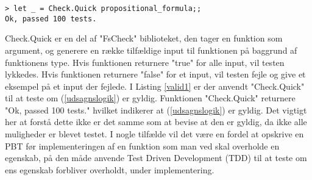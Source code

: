 

\begin{lstlisting}[style=output, label={lst:output_example}, caption={Output ved PBT af (\ref{udsagnslogik})}]
> let _ = Check.Quick propositional_formula;;
Ok, passed 100 tests.
\end{lstlisting}

Check.Quick er en del af "FsCheck" biblioteket, den tager en funktion som argument, og generere en række tilfældige input til funktionen på baggrund af funktionens type. Hvis funktionen returnere "true" for alle input, vil testen lykkedes. Hvis funktionen returnere "false" for et input, vil testen fejle og give et eksempel på et input der fejlede. I Listing \ref{valid1} er der anvendt "Check.Quick" til at teste om (\ref{udsagnslogik}) er gyldig. Funktionen "Check.Quick" returnere "Ok, passed 100 tests." hvilket indikerer at (\ref{udsagnslogik}) er gyldig. Det vigtigt her at forstå dette ikke er det samme som at bevise at den er gyldig, da ikke alle muligheder er blevet testet. 
I nogle tilfælde vil det være en fordel at opskrive en PBT før implementeringen af en funktion som man ved skal overholde en egenskab, på den måde anvende Test Driven Development (TDD)  til at teste om ens egenskab forbliver overholdt, under implementering.
